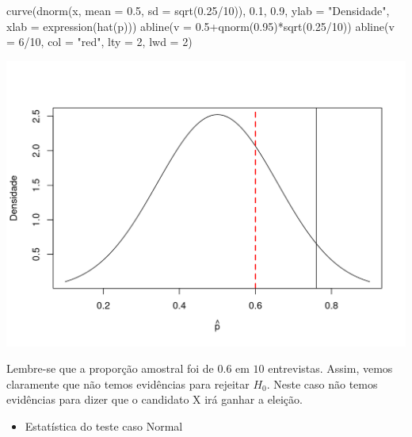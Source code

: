\documentclass[
  10pt,
  a4paper]{book}
\newenvironment{Shaded}{\begin{snugshade}}{\end{snugshade}}
\newcommand{\AttributeTok}[1]{\textcolor[rgb]{0.77,0.63,0.00}{#1}}
\newcommand{\DecValTok}[1]{\textcolor[rgb]{0.00,0.00,0.81}{#1}}
\newcommand{\FloatTok}[1]{\textcolor[rgb]{0.00,0.00,0.81}{#1}}
\newcommand{\FunctionTok}[1]{\textcolor[rgb]{0.00,0.00,0.00}{#1}}
\newcommand{\NormalTok}[1]{#1}
\newcommand{\SpecialCharTok}[1]{\textcolor[rgb]{0.00,0.00,0.00}{#1}}
\newcommand{\StringTok}[1]{\textcolor[rgb]{0.31,0.60,0.02}{#1}}
\providecommand{\tightlist}{%
  \setlength{\itemsep}{0pt}\setlength{\parskip}{0pt}}
\begin{document}
\begin{Shaded}
\begin{Highlighting}[]
\FunctionTok{curve}\NormalTok{(}\FunctionTok{dnorm}\NormalTok{(x, }\AttributeTok{mean =} \FloatTok{0.5}\NormalTok{, }\AttributeTok{sd =} \FunctionTok{sqrt}\NormalTok{(}\FloatTok{0.25}\SpecialCharTok{/}\DecValTok{10}\NormalTok{)), }\FloatTok{0.1}\NormalTok{, }\FloatTok{0.9}\NormalTok{, }
      \AttributeTok{ylab =} \StringTok{"Densidade"}\NormalTok{, }\AttributeTok{xlab =} \FunctionTok{expression}\NormalTok{(}\FunctionTok{hat}\NormalTok{(p)))}
\FunctionTok{abline}\NormalTok{(}\AttributeTok{v =} \FloatTok{0.5}\SpecialCharTok{+}\FunctionTok{qnorm}\NormalTok{(}\FloatTok{0.95}\NormalTok{)}\SpecialCharTok{*}\FunctionTok{sqrt}\NormalTok{(}\FloatTok{0.25}\SpecialCharTok{/}\DecValTok{10}\NormalTok{))}
\FunctionTok{abline}\NormalTok{(}\AttributeTok{v =} \DecValTok{6}\SpecialCharTok{/}\DecValTok{10}\NormalTok{, }\AttributeTok{col =} \StringTok{"red"}\NormalTok{, }\AttributeTok{lty =} \DecValTok{2}\NormalTok{, }\AttributeTok{lwd =} \DecValTok{2}\NormalTok{)}
\end{Highlighting}
\end{Shaded}

\begin{center}\includegraphics{figures/unnamed-chunk-390-1} \end{center}

Lembre-se que a proporção amostral foi de \(0.6\) em \(10\) entrevistas.
Assim, vemos claramente que não temos evidências para rejeitar \(H_0\).
Neste caso não temos evidências para dizer que o candidato X irá ganhar a eleição.

\begin{itemize}
\tightlist
\item
  Estatística do teste caso Normal
\end{itemize}
\end{document}
